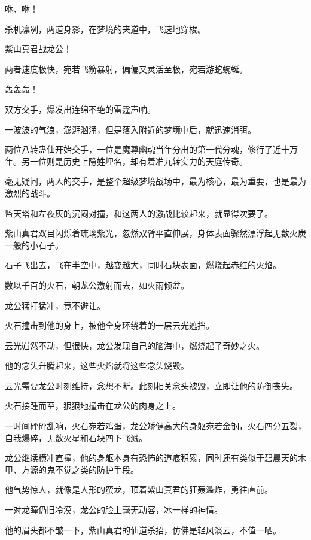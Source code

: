 
\begin{this_body}

咻、咻！

杀机凛冽，两道身影，在梦境的夹道中，飞速地穿梭。

紫山真君战龙公！

两者速度极快，宛若飞箭暴射，偏偏又灵活至极，宛若游蛇蜿蜒。

轰轰轰！

双方交手，爆发出连绵不绝的雷霆声响。

一波波的气浪，澎湃汹涌，但是落入附近的梦境中后，就迅速消弭。

两位八转蛊仙开始交手，一位是魔尊幽魂当年分出的第一代分魂，修行了近十万年。另一位则是历史上隐姓埋名，却有着准九转实力的天庭传奇。

毫无疑问，两人的交手，是整个超级梦境战场中，最为核心，最为重要，也是最为激烈的战斗。

监天塔和左夜灰的沉闷对撞，和这两人的激战比较起来，就显得次要了。

紫山真君双目闪烁着琉璃紫光，忽然双臂平直伸展，身体表面骤然漂浮起无数火炭一般的小石子。

石子飞出去，飞在半空中，越变越大，同时石块表面，燃烧起赤红的火焰。

数以千百的火石，朝龙公激射而去，如火雨倾盆。

龙公猛打猛冲，竟不避让。

火石撞击到他的身上，被他全身环绕着的一层云光遮挡。

云光岿然不动，但很快，龙公发现自己的脑海中，燃烧起了奇妙之火。

他的念头升腾起来，这些火焰就将这些念头烧毁。

云光需要龙公时刻维持，念想不断。此刻相关念头被毁，立即让他的防御丧失。

火石接踵而至，狠狠地撞击在龙公的肉身之上。

一时间砰砰乱响，火石宛若鸡蛋，龙公矫健高大的身躯宛若金钢，火石四分五裂，自我爆碎，无数火星和石块四下飞溅。

龙公继续横冲直撞，他的身躯本身有恐怖的道痕积累，同时还有类似于碧晨天的木甲、方源的鬼不觉之类的防护手段。

他气势惊人，就像是人形的蛮龙，顶着紫山真君的狂轰滥炸，勇往直前。

一对龙瞳仍旧冷漠，龙公的脸上毫无动容，冰一样的神情。

他的眉头都不皱一下，紫山真君的仙道杀招，仿佛是轻风淡云，不值一哂。


\end{this_body}
